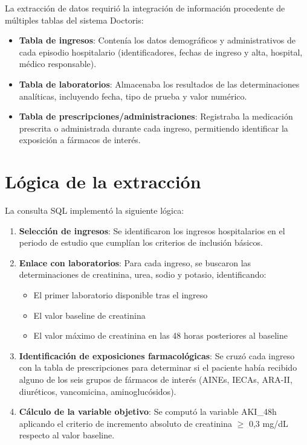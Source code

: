 \documentclass[12pt, a4paper, oneside]{report}
\begin{document}
La extracción de datos requirió la integración de información procedente de múltiples tablas del sistema Doctoris:

\begin{itemize}
    \item \textbf{Tabla de ingresos}: Contenía los datos demográficos y administrativos de cada episodio hospitalario (identificadores, fechas de ingreso y alta, hospital, médico responsable).
    
    \item \textbf{Tabla de laboratorios}: Almacenaba los resultados de las determinaciones analíticas, incluyendo fecha, tipo de prueba y valor numérico.
    
    \item \textbf{Tabla de prescripciones/administraciones}: Registraba la medicación prescrita o administrada durante cada ingreso, permitiendo identificar la exposición a fármacos de interés.
\end{itemize}

\section{Lógica de la extracción}

La consulta SQL implementó la siguiente lógica:

\begin{enumerate}
    \item \textbf{Selección de ingresos}: Se identificaron los ingresos hospitalarios en el periodo de estudio que cumplían los criterios de inclusión básicos.
    
    \item \textbf{Enlace con laboratorios}: Para cada ingreso, se buscaron las determinaciones de creatinina, urea, sodio y potasio, identificando:
    \begin{itemize}
        \item El primer laboratorio disponible tras el ingreso
        \item El valor baseline de creatinina
        \item El valor máximo de creatinina en las 48 horas posteriores al baseline
    \end{itemize}
    
    \item \textbf{Identificación de exposiciones farmacológicas}: Se cruzó cada ingreso con la tabla de prescripciones para determinar si el paciente había recibido alguno de los seis grupos de fármacos de interés (AINEs, IECAs, ARA-II, diuréticos, vancomicina, aminoglucósidos).
    
    \item \textbf{Cálculo de la variable objetivo}: Se computó la variable AKI\_48h aplicando el criterio de incremento absoluto de creatinina $\geq$ 0,3 mg/dL respecto al valor baseline.
\end{enumerate}
\end{document}
